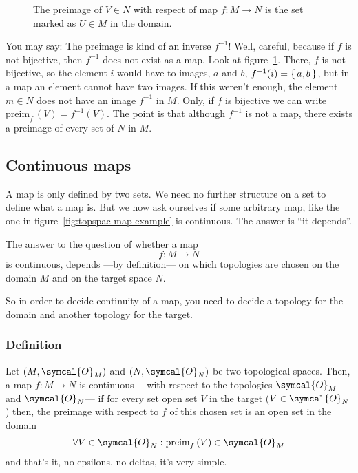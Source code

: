 \begin{figure}[ht]
    \caption{The preimage of $V\in N$ with respect of map $f:M\rightarrow N$ is the set
      marked as $U\in M$ in the domain.}
    \label{fig:topspac-preimagefV}
  \end{figure}

  You may say: The preimage is kind of an inverse $f^{-1}$!
  Well, careful, because if $f$ is not bijective, then $f^{-1}$ does not exist as a
  map. Look at figure~\ref{fig:topspac-preimagefV}. There, $f$ is not bijective, so the
  element $i$ would have to images, $a$ and $b$, $f^{-1}(i) = \set{a, b}$, but in a map
  an element cannot have two images.
  If this weren't enough, the element $m\in N$ does not have an image $f^{-1}$ in $M$.
  Only, if $f$ is bijective we can write $\text{preim}_f\,(V) = f^{-1}(V)$.
  The point is that although $f^{-1}$ is not a map, there exists a preimage of every
  set of $N$ in $M$.
  
  \subsection{Continuous maps}
  A map is only defined by two sets. We need no further structure on a set to define
  what a map is.
  But we now ask ourselves if some arbitrary map, like the one in
  figure~\ref{fig:topspac-map-example} is continuous. The answer is ``it depends''.

  The answer to the question of whether a map
  \[f: M\longrightarrow N\]
  is continuous, depends ---by definition--- on which topologies are chosen on the
  domain $M$ and on the target space $N$.

  So in order to decide continuity of a map, you need to decide a topology for the
  domain and another topology for the target.

  \subsubsection{Definition}
  Let $(M,\symcal{O}_M)$ and $(N,\symcal{O}_N)$ be two topological spaces.
  Then, a map $f:M\longrightarrow N$
  is continuous ---with respect to the topologies $\symcal{O}_M$ and $\symcal{O}_N$---
  if for every set open set $V$ in the target\footnotemark{} ($V\in\symcal{O}_N$) then,
  the preimage with respect to $f$ of this chosen set is an open set in the domain
  \[
    \forall V\in\symcal{O}_N : \text{preim}_f\,(V) \in \symcal{O}_M
  \]
  and that's it, no epsilons, no deltas, it's very simple.

